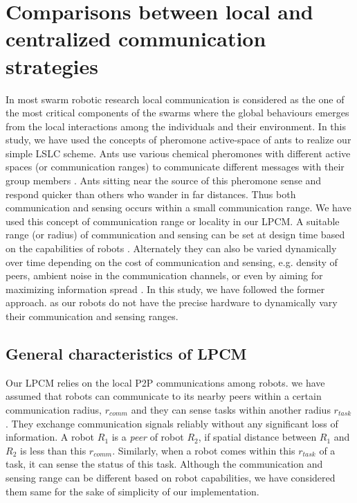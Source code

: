 \documentclass{intech}
\begin{document}
\section{Comparisons between local and centralized communication strategies}
In most swarm robotic research local communication is considered as the one of the most critical components of the swarms where the global behaviours emerges from the local interactions among the individuals and their environment. In this study, we have used the concepts of pheromone active-space of ants to realize our simple LSLC scheme. Ants use various chemical pheromones with different active spaces (or communication ranges) to communicate different messages with their group members \cite{Holldobler1990}. Ants sitting near the source of this pheromone sense and respond quicker than others who wander in far distances. Thus both communication and sensing occurs within a small communication range. We have used this concept of communication range or locality in our LPCM. A suitable  range (or radius) of communication and sensing can be set at design time based on the capabilities of robots \citep{Agassounon+2002}. Alternately they can also be varied dynamically over time depending on the  cost of communication and sensing, e.g. density of peers, ambient noise in the communication channels, or even by aiming for maximizing information spread  \citep{Yoshida+2000}. In this study, we have followed the former approach. as our robots do not have the precise hardware to dynamically vary their communication and sensing ranges.
\subsection{General characteristics of LPCM}
Our LPCM relies on the local P2P communications among robots. we have assumed that robots can communicate to its nearby peers within a certain communication radius, $r_{comm}$ and they can sense tasks within another radius $r_{task}$. They exchange communication signals reliably without any significant loss of information. A robot $R_1$ is a {\em peer} of robot $R_2$, if spatial distance between $R_1$ and $R_2$ is less than this $r_{comm}$.
Similarly, when a robot comes within this $r_{task}$ of a task, it can sense the status of this task. Although the communication and sensing  range can be different based on robot capabilities, we have considered them same for the sake of simplicity of our implementation.
\end{document}
